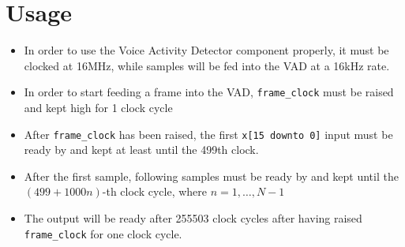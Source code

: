 \section{Usage}
\begin{itemize}
  \item In order to use the Voice Activity Detector component properly,
        it must be clocked at 16\si{\mega\hertz}, while samples will be fed
        into the VAD at a 16\si{\kilo\hertz} rate.
  \item In order to start feeding a frame into the VAD,
        \texttt{frame\_clock} must be raised and kept high for 1 clock cycle
  \item After \texttt{frame\_clock} has been raised,
        the first \texttt{x[15 downto 0]} input must be ready by
        and kept at least until the 499th clock.
  \item After the first sample, following samples must be ready by
        and kept until the $(499 + 1000n)$-th clock cycle, where
        $n = 1, \dots, N - 1$
  \item The output will be ready after 255503 clock cycles after having raised
        \texttt{frame\_clock} for one clock cycle.
\end{itemize}
